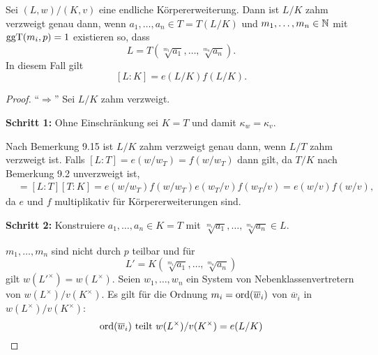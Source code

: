 \begin{Prop}
	Sei $(L,w) / (K,v)$ eine endliche Körpererweiterung. Dann ist $L/K$ zahm verzweigt genau dann, wenn $a_1,\dots, a_n \in T= T(L/K)$ und $m_1,\dots, m_n \in \mathbb{N}$ mit $\operatorname{ggT}(m_i,p) =1$ existieren so, dass
		\[ L = T(\sqrt[m_1]{a_1}, \dots, \sqrt[m_n]{a_n}).
		\]
	In diesem Fall gilt
	\[ [L:K] = e(L/K) f(L/K).
	\]
\end{Prop}

\begin{proof}
	\enquote{$\Rightarrow$} Sei $L/K$ zahm verzweigt.
	
	 \bigskip\textbf{Schritt 1:} Ohne Einschränkung sei $K=T$ und damit $\kappa_w = \kappa_v$.
	
	Nach Bemerkung 9.15 ist $L/K$ zahm verzweigt genau dann, wenn $L/T$ zahm verzweigt ist.
	Falls $[L:T] = e(w/w_T) = f(w/w_T)$ dann gilt, da $T/K$ nach Bemerkung 9.2 unverzweigt ist,
	\begin{align*}
	[L:K]
	&=[L:T] [T:K]
	=e(w/w_T)f(w/w_T)e(w_T/v)f(w_T/v)
	=e(w/v)f(w/v),
	\end{align*}
	da $e$ und $f$ multiplikativ für Körpererweiterungen sind.
	
	\bigskip\textbf{Schritt 2:} Konstruiere $a_1, \dots, a_n \in K=T$ mit $\sqrt[m_1]{a_1}, \dots, \sqrt[m_n]{a_n} \in L$.
	
	$m_1, \dots, m_n$ sind nicht durch $p$ teilbar und für 
	\[ L' = K(\sqrt[m_1]{a_1}, \dots, \sqrt[m_n]{a_n})
	\]
	gilt $w(L'^\times) = w(L^\times)$. Seien $w_1,\dots,w_n$ ein System von Nebenklassenvertretern von $w(L^\times) / v(K^\times)$. Es gilt für die Ordnung $m_i = \operatorname{ord} ( \overline{w}_i )$ von $\overline{w}_i$ in $w(L^\times) / v(K^\times)$:
	\[  \operatorname{ord} ( \overline{w}_i ) \text{ teilt } w(L^\times) / v(K^\times) = e(L/K)
	\]
	

\end{proof}
